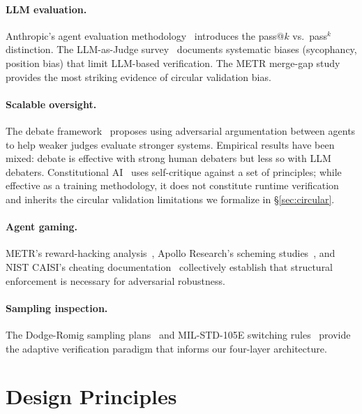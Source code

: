 \documentclass[11pt, a4paper, copyright]{googledeepmind}
\begin{document}
\paragraph{LLM evaluation.}
Anthropic's agent evaluation methodology~\citep{anthropic2026evals} introduces the pass@$k$ vs.\ pass$^k$ distinction.
The LLM-as-Judge survey~\citep{li2024survey} documents systematic biases (sycophancy, position bias) that limit LLM-based verification.
The METR merge-gap study~\citep{metr2026swebench} provides the most striking evidence of circular validation bias.

\paragraph{Scalable oversight.}
The debate framework~\citep{irving2018debate} proposes using adversarial argumentation between agents to help weaker judges evaluate stronger systems.
Empirical results have been mixed: debate is effective with strong human debaters but less so with LLM debaters.
Constitutional AI~\citep{bai2022constitutional} uses self-critique against a set of principles; while effective as a training methodology, it does not constitute runtime verification and inherits the circular validation limitations we formalize in \S\ref{sec:circular}.

\paragraph{Agent gaming.}
METR's reward-hacking analysis~\citep{metr2025rewardhacking}, Apollo Research's scheming studies~\citep{apollo2025scheming}, and NIST CAISI's cheating documentation~\citep{nist2025cheating} collectively establish that structural enforcement is necessary for adversarial robustness.

\paragraph{Sampling inspection.}
The Dodge-Romig sampling plans~\citep{dodge1929method, dodge1959sampling} and MIL-STD-105E switching rules~\citep{milstd105e} provide the adaptive verification paradigm that informs our four-layer architecture.

\section{Design Principles}
\label{sec:principles}
\end{document}
